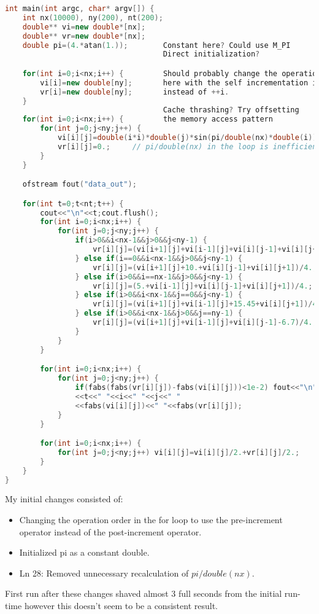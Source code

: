 \documentclass[11pt]{report}
\begin{document}
\begin{lstlisting}[language=C++, caption=Original code listing]
int main(int argc, char* argv[]) {
    int nx(10000), ny(200), nt(200);        
    double** vi=new double*[nx];
    double** vr=new double*[nx];
    double pi=(4.*atan(1.));        Constant here? Could use M_PI 
                                    Direct initialization?

    for(int i=0;i<nx;i++) {         Should probably change the operation order 
        vi[i]=new double[ny];       here with the self incrementation ie. ++i
        vr[i]=new double[ny];       instead of ++i. 
    }
                                    Cache thrashing? Try offsetting
    for(int i=0;i<nx;i++) {         the memory access pattern 
        for(int j=0;j<ny;j++) {       
            vi[i][j]=double(i*i)*double(j)*sin(pi/double(nx)*double(i));  
            vr[i][j]=0.;     // pi/double(nx) in the loop is inefficient //
        }
    }

    ofstream fout("data_out");

    for(int t=0;t<nt;t++) {
        cout<<"\n"<<t;cout.flush();
        for(int i=0;i<nx;i++) {
            for(int j=0;j<ny;j++) {
                if(i>0&&i<nx-1&&j>0&&j<ny-1) {
                    vr[i][j]=(vi[i+1][j]+vi[i-1][j]+vi[i][j-1]+vi[i][j+1])/4.;
                } else if(i==0&&i<nx-1&&j>0&&j<ny-1) {
                    vr[i][j]=(vi[i+1][j]+10.+vi[i][j-1]+vi[i][j+1])/4.;
                } else if(i>0&&i==nx-1&&j>0&&j<ny-1) {
                    vr[i][j]=(5.+vi[i-1][j]+vi[i][j-1]+vi[i][j+1])/4.;
                } else if(i>0&&i<nx-1&&j==0&&j<ny-1) {
                    vr[i][j]=(vi[i+1][j]+vi[i-1][j]+15.45+vi[i][j+1])/4.;
                } else if(i>0&&i<nx-1&&j>0&&j==ny-1) {
                    vr[i][j]=(vi[i+1][j]+vi[i-1][j]+vi[i][j-1]-6.7)/4.;
                }
            }
        }

        for(int i=0;i<nx;i++) {
            for(int j=0;j<ny;j++) {
                if(fabs(fabs(vr[i][j])-fabs(vi[i][j]))<1e-2) fout<<"\n"
                <<t<<" "<<i<<" "<<j<<" "
                <<fabs(vi[i][j])<<" "<<fabs(vr[i][j]);
            }
        }

        for(int i=0;i<nx;i++) {
            for(int j=0;j<ny;j++) vi[i][j]=vi[i][j]/2.+vr[i][j]/2.;
        }
    }
}
\end{lstlisting}
\vspace{20cm}
My initial changes consisted of:
\begin{itemize}
    \item Changing the operation order in the for loop to use the pre-increment operator instead of the post-increment operator.
    \item Initialized pi as a constant double.
    \item Ln 28: Removed unnecessary recalculation of $pi / double(nx)$.
\end{itemize}
First run after these changes shaved almost 3 full seconds from the initial run-time however this doesn't seem to be a consistent result.
\end{document}
